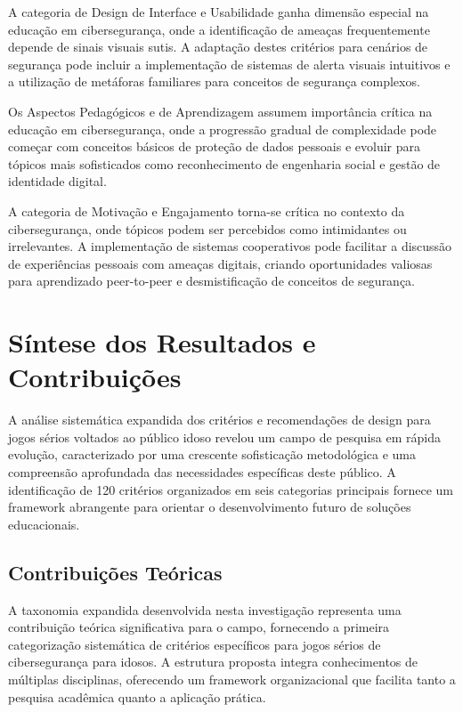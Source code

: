 \begin{table}[H]
A categoria de Design de Interface e Usabilidade ganha dimensão especial na educação em cibersegurança, onde a identificação de ameaças frequentemente depende de sinais visuais sutis. A adaptação destes critérios para cenários de segurança pode incluir a implementação de sistemas de alerta visuais intuitivos e a utilização de metáforas familiares para conceitos de segurança complexos.

Os Aspectos Pedagógicos e de Aprendizagem assumem importância crítica na educação em cibersegurança, onde a progressão gradual de complexidade pode começar com conceitos básicos de proteção de dados pessoais e evoluir para tópicos mais sofisticados como reconhecimento de engenharia social e gestão de identidade digital.

A categoria de Motivação e Engajamento torna-se crítica no contexto da cibersegurança, onde tópicos podem ser percebidos como intimidantes ou irrelevantes. A implementação de sistemas cooperativos pode facilitar a discussão de experiências pessoais com ameaças digitais, criando oportunidades valiosas para aprendizado peer-to-peer e desmistificação de conceitos de segurança.

\section{Síntese dos Resultados e Contribuições}
\label{sec:sintese_expandida}

A análise sistemática expandida dos critérios e recomendações de design para jogos sérios voltados ao público idoso revelou um campo de pesquisa em rápida evolução, caracterizado por uma crescente sofisticação metodológica e uma compreensão aprofundada das necessidades específicas deste público. A identificação de 120 critérios organizados em seis categorias principais fornece um framework abrangente para orientar o desenvolvimento futuro de soluções educacionais.

\subsection{Contribuições Teóricas}
\label{subsec:contribuicoes_teoricas}

A taxonomia expandida desenvolvida nesta investigação representa uma contribuição teórica significativa para o campo, fornecendo a primeira categorização sistemática de critérios específicos para jogos sérios de cibersegurança para idosos. A estrutura proposta integra conhecimentos de múltiplas disciplinas, oferecendo um framework organizacional que facilita tanto a pesquisa acadêmica quanto a aplicação prática.


\end{table}
